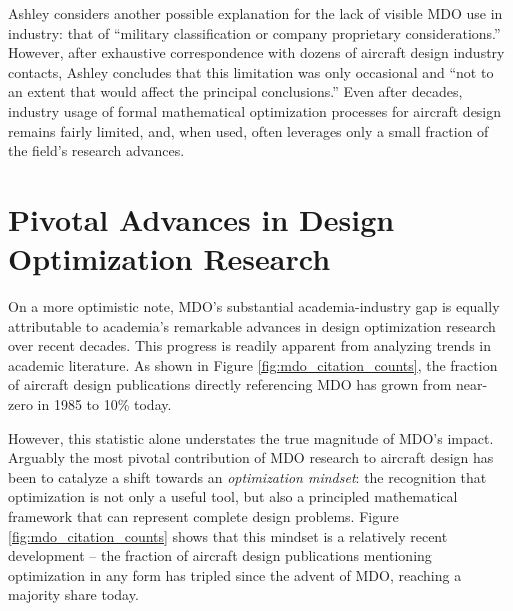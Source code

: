 \documentclass[12pt,vi,oneside]{report}
\begin{document}
    Ashley considers another possible explanation for the lack of visible MDO use in industry: that of ``military classification or company proprietary considerations.'' \cite{ashley_making_1982} However, after exhaustive correspondence with dozens of aircraft design industry contacts, Ashley concludes that this limitation was only occasional and ``not to an extent that would affect the principal conclusions.'' Even after decades, industry usage of formal mathematical optimization processes for aircraft design remains fairly limited, and, when used, often leverages only a small fraction of the field's research advances.


    \section{Pivotal Advances in Design Optimization Research}
    \label{sec:literature_advances}

    On a more optimistic note, MDO's substantial academia-industry gap is equally attributable to academia's remarkable advances in design optimization research over recent decades. This progress is readily apparent from analyzing trends in academic literature. As shown in Figure \ref{fig:mdo_citation_counts}, the fraction of aircraft design publications directly referencing MDO has grown from near-zero in 1985 to 10\% today.

    However, this statistic alone understates the true magnitude of MDO's impact. Arguably the most pivotal contribution of MDO research to aircraft design has been to catalyze a shift towards an \textit{optimization mindset}: the recognition that optimization is not only a useful tool, but also a principled mathematical framework that can represent complete design problems. Figure \ref{fig:mdo_citation_counts} shows that this mindset is a relatively recent development -- the fraction of aircraft design publications mentioning optimization in any form has tripled since the advent of MDO, reaching a majority share today.
\end{document}
